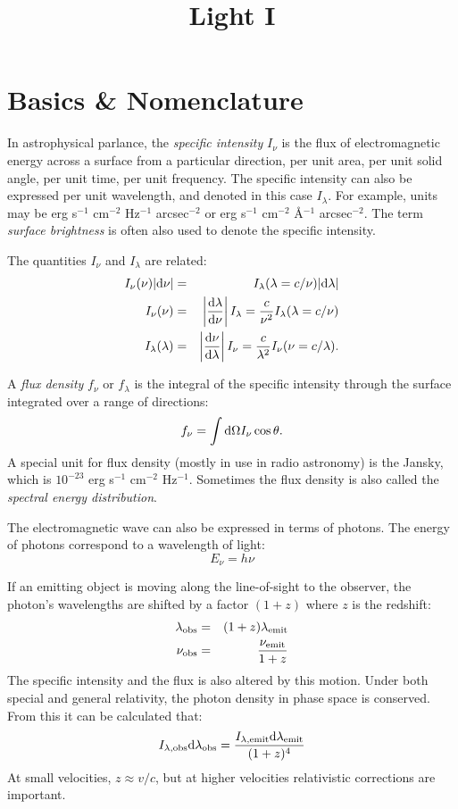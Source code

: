 \title{\bf Light I}

\section{Basics \& Nomenclature}

In astrophysical parlance, the {\it specific intensity} $I_\nu$ is the
flux of electromagnetic energy across a surface from a particular
direction, per unit area, per unit solid angle, per unit time, per
unit frequency. The specific intensity can also be expressed per unit
wavelength, and denoted in this case $I_\lambda$. For example, units
may be erg s$^{-1}$ cm$^{-2}$ Hz$^{-1}$ arcsec$^{-2}$ or erg s$^{-1}$
cm$^{-2}$ \AA$^{-1}$ arcsec$^{-2}$.  The term {\it surface brightness}
is often also used to denote the specific intensity.

The quantities $I_\nu$ and $I_\lambda$ are related:
\begin{eqnarray}
I_\nu(\nu) |{\rm d}\nu| &=& I_\lambda(\lambda = c/\nu) |{\rm
  d}\lambda| \cr
I_\nu(\nu) &=& \left|\frac{{\rm d}\lambda}{{\rm d}\nu}\right|
I_\lambda = \frac{c}{\nu^2} I_\lambda(\lambda = c/\nu) \cr
I_\lambda(\lambda) &=& \left|\frac{{\rm d}\nu}{{\rm d}\lambda}\right|
I_\nu = \frac{c}{\lambda^2} I_\nu(\nu = c/\lambda).
\end{eqnarray}

A {\it flux density} $f_\nu$ or $f_\lambda$ is the integral of the
specific intensity through the surface integrated over a range of
directions:
\begin{equation}
f_\nu = \int {\rm d}\Omega I_\nu \cos\theta. 
\end{equation}
A special unit for flux density (mostly in use in radio astronomy) is
the Jansky, which is $10^{-23}$ erg s$^{-1}$ cm$^{-2}$
Hz$^{-1}$. Sometimes the flux density is also called the {\it spectral
  energy distribution}.

The electromagnetic wave can also be expressed in terms of
photons. The energy of photons correspond to a wavelength of light:
\begin{equation}
E_\nu = h\nu
\end{equation}

If an emitting object is moving along the line-of-sight to the
observer, the photon's wavelengths are shifted by a factor $(1+z)$
where $z$ is the redshift:
\begin{eqnarray}
\lambda_{\rm obs}  &=& (1+z) \lambda_{\rm emit} \cr
\nu_{\rm obs}  &=& \frac{\nu_{\rm emit}}{1+z}
\end{eqnarray}
The specific intensity and the flux is also altered by this
motion. Under both special and general relativity, the photon density
in phase space is conserved. From this it can be calculated that:
\begin{equation}
  \label{eq:sb_dimming}
  I_{\lambda, {\rm obs}} {\rm d}\lambda_{\rm obs} = 
  \frac{I_{\lambda, {\rm emit}} {\rm d}\lambda_{\rm emit}}{(1+z)^4}
\end{equation}
At small velocities, $z \approx v/c$, but at higher velocities
relativistic corrections are important.

